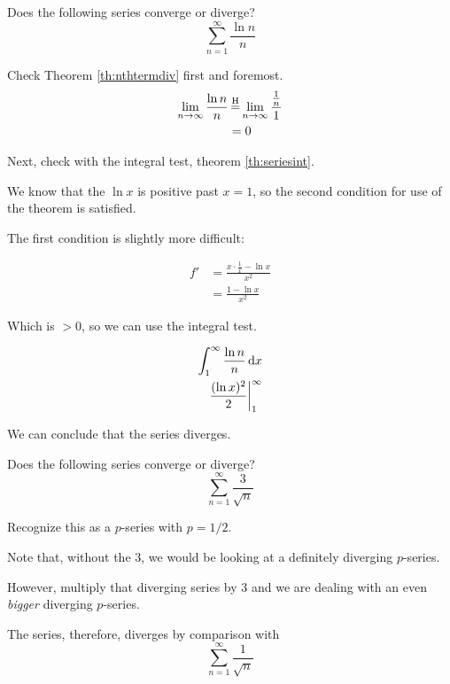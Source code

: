%
%
\begin{ex}
  Does the following series converge or diverge?
  \[ \sum_{n=1}^\infty \frac{\ln n}{n} \]
  \begin{sol}
    Check Theorem \ref{th:nthtermdiv} first and foremost.
    \begin{align*}
      \lim_{n \to \infty} \frac{\ln n}{n}
      &\=H \lim_{n \to \infty} \frac{\frac{1}{n}}{1} \\
      &= 0
    \end{align*}

    Next, check with the integral test, theorem \ref{th:seriesint}.

    We know that the \(\ln x\) is positive past \(x=1\), so the second condition
    for use of the theorem is satisfied.

    The first condition is slightly more difficult:

    \begin{align*}
      f' &= \frac{x \cdot \frac{1}{x}- \ln x}{x^2} \\
      &= \frac{1- \ln x}{x^2}
    \end{align*}

    Which is \( > 0 \), so we can use the integral test.

    \begin{align*}
      \int_{1}^{\infty} \frac{\ln n}{n} \,\mathrm{d} x \\
      \frac{(\ln x)^2}{2} \bigg|_{1}^{\infty}
    \end{align*}

    We can conclude that the series diverges.
  \end{sol}
\end{ex}
\begin{ex}
  Does the following series converge or diverge?
  \[ \sum^\infty_{n=1} \frac{3}{\sqrt{n}} \]
  \begin{sol}
    Recognize this as a \(p\)-series with \(p=1/2\).

    Note that, without the \(3\), we would be looking at a definitely diverging
    \(p\)-series.

    However, multiply that diverging series by \(3\) and we are dealing with an
    even \emph{bigger} diverging \(p\)-series.

    The series, therefore, diverges by comparison with \[
      \sum_{n=1}^\infty \frac{1}{\sqrt{n}} \]
  \end{sol}
\end{ex}
